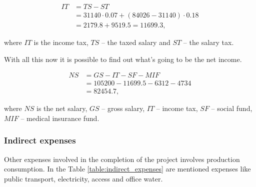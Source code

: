 \documentclass[12pt,a4paper,titlepage]{article}
\begin{document}
\begin{equation}
\begin{split}
 IT &= TS - ST \\
      &= 31140 \cdot 0.07 + (84026 - 31140) \cdot 0.18 \\
      & = 2179.8 + 9519.5 = 11699.3,
 \end{split}
\end{equation}

\noindent
where $IT$ is the income tax, $TS$ -- the taxed salary and $ST$ -- the salary tax. 

With all this now it is possible to find out what's going to be the net income.

\begin{equation}
\begin{split}
 NS &= GS - IT - SF - MIF \\
            &= 105200 - 11699.5 - 6312 - 4734 \\
            &= 82454.7,
\end{split}
\end{equation}

\noindent
where $NS$ is the net salary, $GS$ -- gross salary, $IT$ -- income tax, $SF$ -- social fund, $MIF$ -- medical insurance fund.

\subsubsection{Indirect expenses}
Other expenses involved in the completion of the project involves production consumption. In the Table \ref{table:indirect_expenses} are mentioned expenses like public transport, electricity, 
 access and office water. 

\begin{table}[H]
\centering
\caption{Indirect expenses}
\label{table:indirect_expenses}
\end{table}
\end{document}

